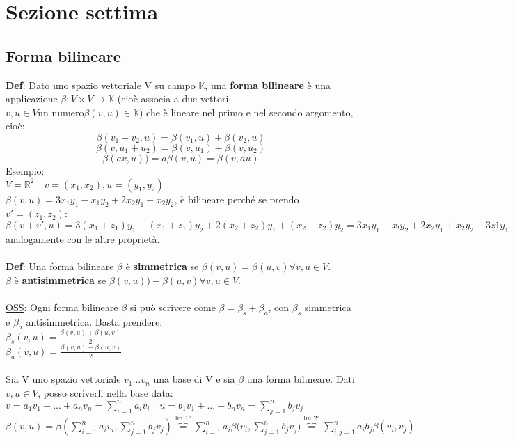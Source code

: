 \documentclass[12pt]{article}
\begin{document}
\section{Sezione settima}
\subsection{Forma bilineare}
\textbf{\underline{Def}}: Dato uno spazio vettoriale V su campo $\mathbb{K}$, una \textbf{forma bilineare} è una applicazione $\beta: V\times V \longrightarrow \mathbb{K}$ (cioè associa a due vettori $v,u \in V \text{un numero}\beta (v,u)\in \mathbb{K}$) che è lineare nel primo e nel secondo argomento, cioè:
$$\beta(v_1+v_2,u) = \beta(v_1,u)+\beta(v_2,u)$$
$$\beta(v,u_1+u_2) = \beta(v,u_1) + \beta(v, u_2)$$
$$\beta(av, u) ) = a\beta(v,u) = \beta(v,au)$$
Esempio:\\
$V = \mathbb{R}^2\quad v = (x_1,x_2), u= (y_1,y_2)$\\
$\beta(v,u) = 3x_1y_1-x_1y_2+2x_2y_1+x_2y_2$, è bilineare perché se prendo $v' = (z_1,z_2)$:\\
$\beta(v+v',u) = 3(x_1+z_1)y_1-(x_1+z_1)y_2+2(x_2+z_2)y_1+(x_2+z_2)y_2=3x_1y_1-x_!y_2+2x_2y_1+x_2y_2+3z1y_1-z_1y_2+2z_2y_1+z_2y_2 = \beta(v,u) + \beta(v',u)$\\
analogamente con le altre proprietà.\\\\
\textbf{\underline{Def}}: Una forma bilineare $\beta$ è \textbf{simmetrica} se $\beta(v,u) = \beta(u,v) \forall v,u \in V$.\\
$\beta$ è \textbf{antisimmetrica} se $\beta(v,u) ) - \beta(u,v) \forall v,u \in V$.\\\\
\underline{OSS}: Ogni forma bilineare $\beta$ si può scrivere come $\beta = \beta_s + \beta_a$, con $\beta_s$ simmetrica e $\beta_a$ antisimmetrica. Basta prendere:\\
$\beta_s(v,u) = \frac{\beta(v,u)+\beta(u,v)}{2}$\\
$\beta_a(v,u) = \frac{\beta(v,u)-\beta(u,v)}{2} $\\\\
Sia V uno spazio vettoriale $v_1...v_n$ una base di V e sia $\beta$ una forma bilineare.
Dati $v,u \in V$, posso scriverli nella base data:\\
$v = a_1v_1+...+a_nv_n =\displaystyle\sum_{i=1}^{n}a_iv_i  \quad u= b_1v_1+...+b_nv_n = \displaystyle\sum_{j=1}^{n}b_jv_j$\\
$\beta(v,u) = \beta(\displaystyle\sum_{i=1}^{n}a_iv_i,\displaystyle\sum_{j=1}^{n}b_jv_j) \overbrace{=}^{\text{lin 1°}} \displaystyle\sum_{i=1}^{n}{a_i\beta(v_i, \displaystyle\sum_{j=1}^{n}b_jv_j}) \overbrace{=}^{\text{lin 2°}} \displaystyle\sum_{i,j = 1}^{n}a_ib_j\beta(v_i,v_j)$\\
\end{document}
